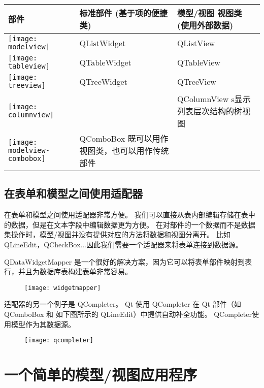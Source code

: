 \begin{longtable}{|l|m{15em}|m{10em}|}
\hline
部件 & 标准部件 (基于项的便捷类) & 模型/视图 视图类 (使用外部数据) \\ 
\hline
\texttt{[image: modelview]}  
&
QListWidget
&
QListView  \\
\hline
\texttt{[image: tableview]}  
&
QTableWidget	
&
QTableView \\
\hline
\texttt{[image: treeview]}  
&
QTreeWidget	
&
QTreeView  \\
\hline
\texttt{[image: columnview]}  
&

&
QColumnView s显示列表层次结构的树视图  \\
\hline
\texttt{[image: modelview-combobox]}  
&
QComboBox 既可以用作视图类，也可以用作传统部件
&
  \\
\hline
\end{longtable}



\subsection{在表单和模型之间使用适配器}

在表单和模型之间使用适配器非常方便。
我们可以直接从表内部编辑存储在表中的数据，但是在文本字段中编辑数据更为方便。
在对部件的一个数据而不是数据集操作时，模型/视图并没有提供对应的方法将数据和视图分离开。
比如 QLineEdit，QCheckBox...因此我们需要一个适配器来将表单连接到数据源。

QDataWidgetMapper 是一个很好的解决方案，因为它可以将表单部件映射到表行，并且为数据库表构建表单非常容易。

\begin{figure}[hbt!]  
\texttt{[image: widgetmapper]}
\end{figure}

适配器的另一个例子是 QCompleter。
Qt 使用 QCompleter 在 Qt 部件（如 QComboBox 和 如下图所示的 QLineEdit）中提供自动补全功能。
QCompleter使用模型作为其数据源。
	
\begin{figure}[hbt!]  
\texttt{[image: qcompleter]}
\end{figure}

\section{一个简单的模型/视图应用程序}


